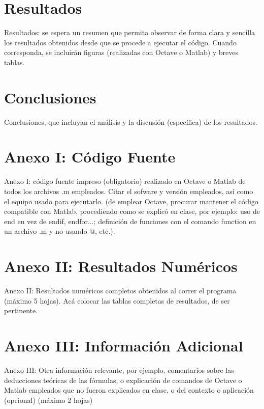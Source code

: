 \documentclass[11pt,a4paper]{article}
\begin{document}
\section{Resultados}
 Resultados: se espera un resumen que permita observar de forma clara y sencilla los
resultados obtenidos desde que se procede a ejecutar el código. Cuando corresponda, se
incluirán figuras (realizadas con Octave o Matlab) y breves tablas.

\section{Conclusiones}
 Conclusiones, que incluyan el análisis y la discusión (específica) de los resultados.

\newpage
\appendix
\section{Anexo I: Código Fuente}
Anexo I: código fuente impreso (obligatorio) realizado en Octave o Matlab de todos los
archivos .m empleados. Citar el sofware y versión empleados, así como el equipo usado para
ejecutarlo. (de emplear Octave, procurar mantener el código compatible con Matlab,
procediendo como se explicó en clase, por ejemplo: uso de end en vez de endif, endfor...;
definición de funciones con el comando function en un archivo .m y no usando @, etc.).

\section{Anexo II: Resultados Numéricos}
Anexo II: Resultados numéricos completos obtenidos al correr el programa (máximo 5
hojas). Acá colocar las tablas completas de resultados, de ser pertinente.

\section{Anexo III: Información Adicional}
Anexo III: Otra información relevante, por ejemplo, comentarios sobre las deducciones
teóricas de las fórmulas, o explicación de comandos de Octave o Matlab empleados que no
fueron explicados en clase, o del contexto o aplicación (opcional) (máximo 2 hojas)

\newpage

{}
\end{document}
